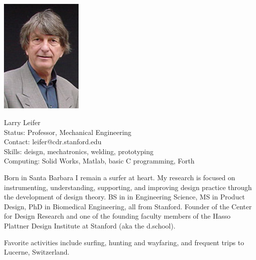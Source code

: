 \begin{framed}
\noindent \includegraphics[width=40mm]{Figures/Ch2/LarryLeifer.jpg}
\parbox[b]{0.6\textwidth}{Larry Leifer\\
Status: Professor, Mechanical Engineering\\
Contact: leifer@cdr.stanford.edu\\
Skills: deisgn, mechatronics, welding, prototyping\\
Computing: Solid Works, Matlab, basic C programming, Forth\\
}

Born in Santa Barbara I remain a surfer at heart.
My research is focused on instrumenting, understanding, supporting, and improving design practice through the development of design theory. BS in in Engineering Science, MS in Product Design, PhD in Biomedical Engineering, all from Stanford.
Founder of the  Center for Design Research and one of the founding faculty members of the Hasso Plattner Design Institute
at Stanford (aka the d.school).

Favorite activities include surfing, hunting and wayfaring, and frequent trips to Lucerne, Switzerland.
\end{framed}

